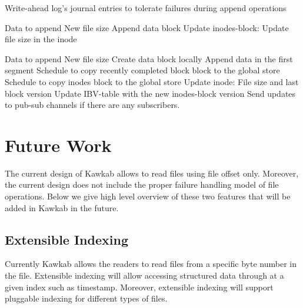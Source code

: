 \documentclass[]{article}
\begin{document}
\begin{algorithm}[ht]
\label{alg:journal}
\caption{Write-ahead log's journal entries to tolerate failures during append operations}
\begin{algorithmic}[1]
\item[]
\State Data to append
\State New file size
\State Append data block
\State Update inodes-block: Update file size in the inode
\EndStruct
\item[]

\State Data to append
\State New file size
\State Create data block locally
\State Append data in the first segment
\State Schedule to copy recently completed block block to the global store
\State Schedule to copy inodes block to the global store
\State Update inode: File size and last block version
\State Update IBV-table with the new inodes-block version
\State Send updates to pub-sub channels if there are any subscribers.
\EndStruct
\end{algorithmic}
\end{algorithm}


\section{Future Work}

The current design of Kawkab allows to read files using file offset only.
Moreover, the current design does not include the proper failure handling 
model of file operations. Below we give high level overview of these two 
features that will be added in Kawkab in the future.


\subsection{Extensible Indexing}

Currently Kawkab allows the readers to read files from a specific
byte number in the file. Extensible indexing will allow accessing structured
data through at a given index such as timestamp. Moreover, extensible indexing
will support pluggable indexing for different types of files.
\end{document}
